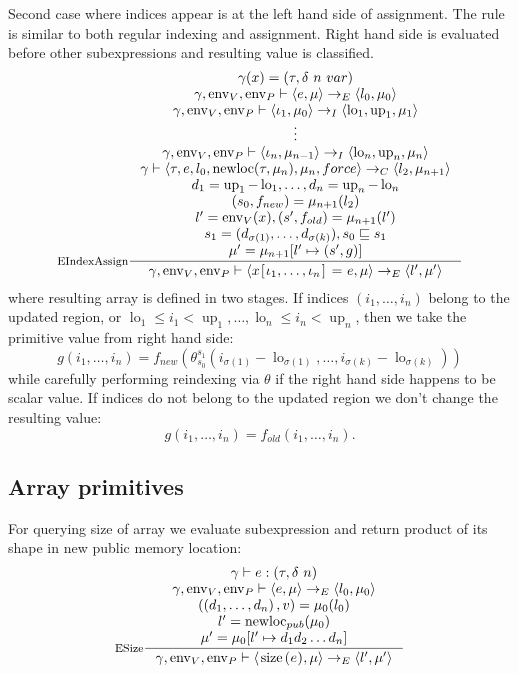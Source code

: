\documentclass[a4paper, 10pt, draft]{report}
\DeclareMathOperator*{\env}{env}
\DeclareMathOperator*{\up}{up}
\DeclareMathOperator*{\lo}{lo}
\DeclareMathOperator*{\newloc}{newloc}
\newcommand{\mycode}[1]{\ensuremath{\mbox{\lstinline{#1}}}}
\begin{document}
Second case where indices appear is at the left hand side of assignment. The
rule is similar to both regular indexing and assignment. Right hand side is
evaluated before other subexpressions and resulting value is classified.
\[ \inference[EIndexAssign]
{
  \gamma(x) = (\tau, \delta\ n\ var) \\
  \gamma, \env_V, \env_P |- \left< e, \mu \right> \to_E \left< l_0, \mu_0 \right> \\
  \gamma, \env_V, \env_P |- \left< \iota_1, \mu_0 \right> \to_I \left< \lo_1, \up_1, \mu_1 \right> \\
  \vdots \\
  \gamma, \env_V, \env_P |- \left< \iota_n, \mu_{n-1} \right> \to_I \left< \lo_n, \up_n, \mu_n \right> \\
  \gamma |- \left< \tau, e, l_0, \newloc(\tau, \mu_n), \mu_n, force \right> \to_C \left<l_2, \mu_{n+1} \right> \\
  d_1 = \up_1 - \lo_1, \ldots, d_n = \up_n - \lo_n \\
  (s_0,f_{new}) = \mu_{n+1}(l_2) \\
  l' = \env_V(x), (s',f_{old}) = \mu_{n+1}(l') \\
  s_1 = (d_{\sigma(1)}, \ldots, d_{\sigma(k)}),  s_0 \sqsubseteq s_1 \\
  \mu' = \mu_{n+1}[l' \mapsto (s', g)]
}{
  \gamma, \env_V, \env_P |- \left< x\mycode{[}\iota_1, \ldots, \iota_n \mycode{]}\ \mycode{=}\ e, \mu \right> \to_E \left< l', \mu' \right>
} \]
where resulting array is defined in two stages. If indices $(i_1,\ldots,i_n)$
belong to the updated region, or $\lo_1 \leq i_1 < \up_1, \ldots, \lo_n \leq
i_n < \up_n $, then we take the primitive value from right hand side:
\[
g(i_1, \ldots, i_n) = f_{new}(\theta_{s_0}^{s_1}(i_{\sigma(1)}-\lo\nolimits_{\sigma(1)}, \ldots, i_{\sigma(k)}-\lo\nolimits_{\sigma(k)}))
\]
while carefully performing reindexing via $\theta$ if the right hand side happens to
be scalar value. If indices do not belong to the updated region we don't change
the resulting value:
\[
g(i_1, \ldots, i_n) = f_{old}(i_1, \ldots, i_n).
\]


\subsection{Array primitives}\label{sec:semantics:exp:arrays}

For querying size of array we evaluate subexpression and return product of its
shape in new public memory location:
\[ \inference[ESize]
{
    \gamma |- e : \left(\tau, \delta\ n \right) \\
    \gamma, \env_V, \env_P |- \left< e, \mu \right> \to_E \left< l_0, \mu_0 \right> \\
    ( \left( d_1,\ldots,d_n \right), v ) = \mu_0(l_0) \\
    l' = \newloc_{pub}(\mu_0) \\
    \mu' = \mu_0[ l' \mapsto d_1 d_2 \ldots d_n ]
}{
  \gamma, \env_V, \env_P |- \left<\mycode{size(} e \mycode{)}, \mu \right> \to_E \left< l',  \mu' \right>
}\]
\end{document}
